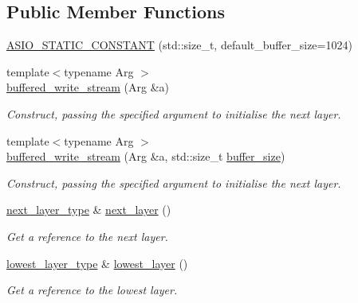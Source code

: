 \subsection*{Public Member Functions}
\begin{DoxyCompactItemize}
\item 
\hyperlink{classasio_1_1buffered__write__stream_a32f9a1c89852f17c82394a2dcd09f578}{A\+S\+I\+O\+\_\+\+S\+T\+A\+T\+I\+C\+\_\+\+C\+O\+N\+S\+T\+A\+N\+T} (std\+::size\+\_\+t, default\+\_\+buffer\+\_\+size=1024)
\item 
{\footnotesize template$<$typename Arg $>$ }\\\hyperlink{classasio_1_1buffered__write__stream_a1b383cede8235ba25410ca18f66ae168}{buffered\+\_\+write\+\_\+stream} (Arg \&a)
\begin{DoxyCompactList}\small\item\em Construct, passing the specified argument to initialise the next layer. \end{DoxyCompactList}\item 
{\footnotesize template$<$typename Arg $>$ }\\\hyperlink{classasio_1_1buffered__write__stream_a5d2b652f457c2ca6b57ebd912461c5ab}{buffered\+\_\+write\+\_\+stream} (Arg \&a, std\+::size\+\_\+t \hyperlink{group__buffer__size_gabe8b5f116fbb66004b6d0ba8ee39c3d5}{buffer\+\_\+size})
\begin{DoxyCompactList}\small\item\em Construct, passing the specified argument to initialise the next layer. \end{DoxyCompactList}\item 
\hyperlink{classasio_1_1buffered__write__stream_a3de64e2c195304dba83b8ae5741be3f9}{next\+\_\+layer\+\_\+type} \& \hyperlink{classasio_1_1buffered__write__stream_af5a9541a4f426f3b4b23ce886c28d8f6}{next\+\_\+layer} ()
\begin{DoxyCompactList}\small\item\em Get a reference to the next layer. \end{DoxyCompactList}\item 
\hyperlink{classasio_1_1buffered__write__stream_af545c11f1e192498c8fa28743590191e}{lowest\+\_\+layer\+\_\+type} \& \hyperlink{classasio_1_1buffered__write__stream_a2d356fdcb475b86830b67e9ebc6d8fbd}{lowest\+\_\+layer} ()
\begin{DoxyCompactList}\small\item\em Get a reference to the lowest layer. \end{DoxyCompactList}\item 

\end{DoxyCompactItemize}
